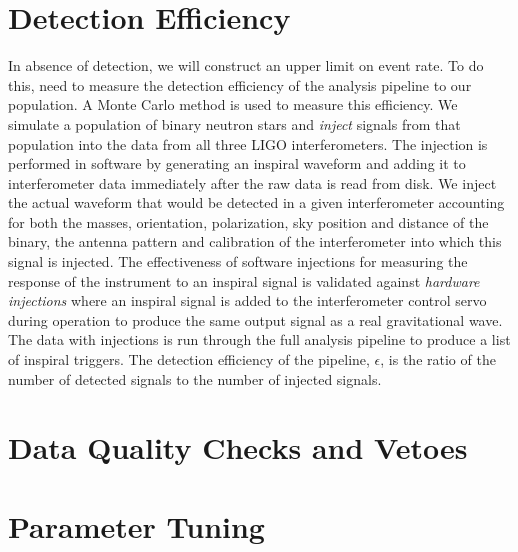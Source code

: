 \section{Detection Efficiency}
\label{s:eff}

In absence of detection, we will construct an upper limit on event rate.  To
do this, need to measure the detection efficiency of the analysis pipeline to
our population. A Monte Carlo method is used to measure this efficiency. We
simulate a population of binary neutron stars and \emph{inject} signals from
that population into the data from all three LIGO interferometers. The
injection is performed in software by generating an inspiral waveform and
adding it to interferometer data immediately after the raw data is read from
disk. We inject the actual waveform that would be detected in a given
interferometer accounting for both the masses, orientation, polarization, sky
position and distance of the binary, the antenna pattern and calibration of
the interferometer into which this signal is injected.  The effectiveness of
software injections for measuring the response of the instrument to an
inspiral signal is validated against \emph{hardware injections}\cite{hw} where
an inspiral signal is added to the interferometer control servo during
operation to produce the same output signal as a real gravitational wave.  The
data with injections is run through the full analysis pipeline to produce a
list of inspiral triggers. The detection efficiency of the pipeline,
$\epsilon$, is the ratio of the number of detected signals to the number of
injected signals.

\section{Data Quality Checks and Vetoes}

\section{Parameter Tuning}


